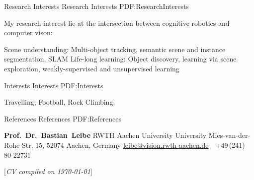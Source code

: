 \documentclass[letterpaper,MMMyyyy,nonstopmode]{simpleresumecv}
\newcommand{\CVNote}{CV compiled on {\today}}
\begin{document}
\begin{Body}

\Section
{Research Interests}
{Research Interests}
{PDF:ResearchInterests}

My research interest lie at the intersection between cognitive robotics and computer vison:
\begin{Detail}
\BulletItem
Scene understanding: Multi-object tracking, semantic scene and instance segmentation, SLAM
\BulletItem
Life-long learning: Object discovery, learning via scene exploration, weakly-supervised and unsupervised learning
\end{Detail}



\Section
{Interests}
{Interests}
{PDF:Interests}

\Entry
Travelling,
Football,
Rock Climbing.


\Section
{References}
{References}
{PDF:References}

\BulletItem
\textbf{Prof.~Dr.~Bastian~Leibe}
\newline
RWTH Aachen University University
\newline
Mies-van-der-Rohe Str. 15, 52074 Aachen, Germany
\newline
\href{mailto:leibe@vision.rwth-aachen.de}
{leibe@vision.rwth-aachen.de}
\,\SubBulletSymbol\,
+49\,(241)\,80-22731

\end{Body}


\UseNoteFont%
\null\hfill%
[\textit{\CVNote}]
\end{document}

